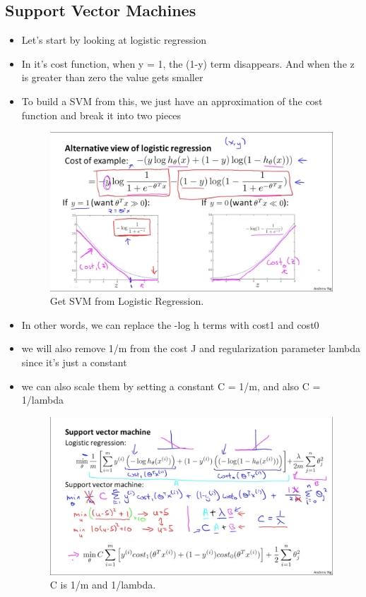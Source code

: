 \documentclass[]{article}
\begin{document}
	\subsection{Support Vector Machines}
		\begin{itemize}
			\item Let's start by looking at logistic regression
			\item In it's cost function, when y = 1, the (1-y) term disappears. And when the z is greater than zero the value gets smaller
			\item To build a SVM from this, we just have an approximation of the cost function and break it into two pieces
			\begin{figure}[ht!]
				\includegraphics[width= 1.5\textwidth,center]{SVM_From_Logistic.png}
				\caption{Get SVM from Logistic Regression.}
			\end{figure}
			
			\item In other words, we can replace the -log h terms with cost1 and cost0
			\item we will also remove 1/m from the cost J and regularization parameter lambda since it's just a constant
			\item we can also scale them by setting a constant C = 1/m, and also C = 1/lambda
			\begin{figure}[ht!]
				\includegraphics[width= 1.5\textwidth,center]{Constant_C.png}
				\caption{C is 1/m and 1/lambda.}
			\end{figure}
			

\end{itemize}
\end{document}
